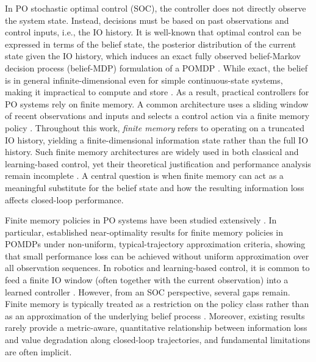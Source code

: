 \documentclass[letterpaper, 10 pt, conference]{ieeeconf}
\begin{document}
In PO stochastic optimal control (SOC), the controller does not directly observe the system state.
Instead, decisions must be based on past observations and control inputs, i.e., the IO history.
It is well-known that optimal control can be expressed in terms of the belief state, the posterior distribution of the current state given the IO history, which induces an exact fully observed belief-Markov decision process (belief-MDP) formulation of a POMDP \cite{smallwood1973optimal, kaelbling1998planning, saldi2017asymptotic}.
While exact, the belief is in general infinite-dimensional even for simple continuous-state systems, making it impractical to compute and store \cite{saldi2018finite}.
As a result, practical controllers for PO systems rely on finite memory.
A common architecture uses a sliding window of recent observations and inputs and selects a control action via a finite memory policy \cite{saldi2017asymptotic, kara2022near}.
Throughout this work, \emph{finite memory} refers to operating on a truncated IO history, yielding a finite-dimensional information state rather than the full IO history.
Such finite memory architectures are widely used in both classical and learning-based control, yet their theoretical justification and performance analysis remain incomplete \cite{white1994finite, subramanian2019approximate, kim2025roverfly, cai2025learning}.
A central question is when finite memory can act as a meaningful substitute for the belief state and how the resulting information loss affects closed-loop performance.

Finite memory policies in PO systems have been studied extensively \cite{saldi2017asymptotic, saldi2018finite, kara2022near, kara2024partially}.
In particular, \cite{kara2022near} established near-optimality results for finite memory policies in POMDPs under non-uniform, typical-trajectory approximation criteria, showing that small performance loss can be achieved without uniform approximation over all observation sequences.
In robotics and learning-based control, it is common to feed a finite IO window (often together with the current observation) into a learned controller \cite{cai2025learning, kim2025roverfly}.
However, from an SOC perspective, several gaps remain.
Finite memory is typically treated as a restriction on the policy class rather than as an approximation of the underlying belief process \cite{kara2022near}.
Moreover, existing results rarely provide a metric-aware, quantitative relationship between information loss and value degradation along closed-loop trajectories, and fundamental limitations are often implicit.
\end{document}
